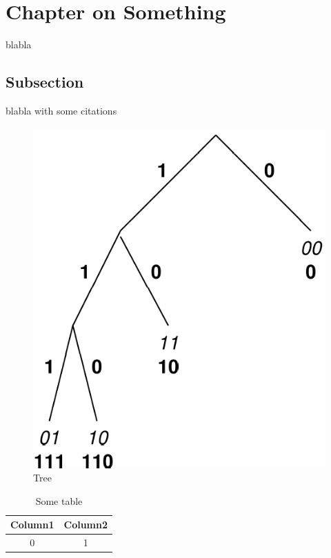 
\section{Chapter on Something}

\noindent blabla

\subsection{Subsection}

\noindent blabla with some citations \cite{Pulay1980_Mixing, Lindner2015_MNQN}

\begin{figure}[h]%
 	\begin{center}%
 		\includegraphics[scale=0.1]{figure1.png}%
 		\caption{Tree}\label{fig:baum}%
 	\end{center}%
\end{figure}

\begin{table}[h]%
 	\begin{center}%
		\caption{Some table}\label{tab:example}%
	 	\begin{tabular}{c|c}%
 			Column1 & Column2\\
 			\hline
 			0 & 1\\
 		\end{tabular}%
 	\end{center}%
\end{table}
